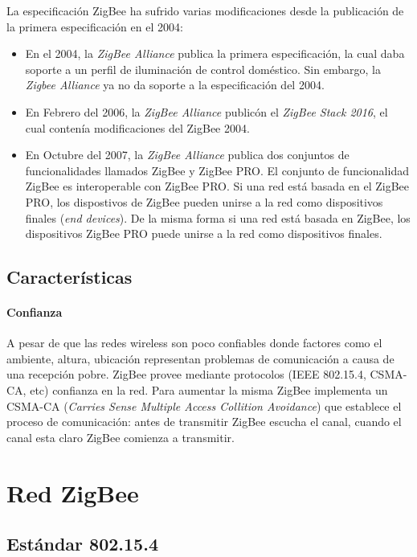 \documentclass[10pt,journal,compsoc]{IEEEtran}
\begin{document}
La especificación ZigBee ha sufrido varias modificaciones desde la publicación de la primera especificación en el 2004:
\begin{itemize}
    \item En el 2004, la \emph{ZigBee Alliance} publica la primera especificación, la cual daba soporte a un perfil de iluminación de control doméstico. Sin embargo, la \emph{Zigbee Alliance} ya no da soporte a la especificación del 2004.
    \item En Febrero del 2006, la \emph{ZigBee Alliance} publicón el \emph{ZigBee Stack 2016}, el cual contenía modificaciones del ZigBee 2004.
    \item En Octubre del 2007, la \emph{ZigBee Alliance} publica dos conjuntos de funcionalidades llamados ZigBee y ZigBee PRO. El conjunto de funcionalidad ZigBee es interoperable con ZigBee PRO. Si una red está basada en el ZigBee PRO, los dispostivos de ZigBee pueden unirse a la red como dispositivos finales (\emph{end devices}). De la misma forma si una red está basada en ZigBee, los dispositivos ZigBee PRO puede unirse a la red como dispositivos finales.
\end{itemize}

\subsection{Características}

\paragraph*{Confianza} A pesar de que las redes wireless son poco confiables donde factores como el ambiente, altura, ubicación representan problemas de comunicación a causa de una recepción pobre. ZigBee provee mediante protocolos (IEEE 802.15.4, CSMA-CA, etc) confianza en la red. Para aumentar la misma ZigBee implementa un CSMA-CA (\emph{Carries Sense Multiple Access Collition Avoidance}) que establece el proceso de comunicación: antes de transmitir ZigBee escucha el canal, cuando el canal esta claro ZigBee comienza a transmitir.



\section{Red ZigBee}
\subsection{Estándar  802.15.4}
\end{document}
